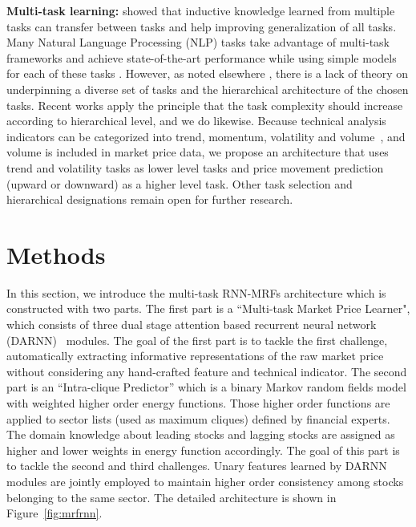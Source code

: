 \textbf{Multi-task learning:} 
showed that inductive knowledge learned from multiple tasks can
transfer between tasks and help improving generalization of all
tasks. Many Natural Language Processing (NLP) tasks take
advantage of multi-task frameworks and achieve state-of-the-art
performance while using simple models for each of these tasks
\cite{sogaard2016deep,hashimoto2016joint}. However, as noted
elsewhere \cite{caruana1993multitask,ruder2017overview}, there is
a lack of theory on underpinning a diverse set of tasks and the
hierarchical architecture of the chosen tasks. Recent works
\cite{sogaard2016deep,hashimoto2016joint} apply the principle
that the task complexity should increase according to
hierarchical level, and we do likewise. Because technical
analysis indicators can be categorized into trend, momentum,
volatility and volume~\cite{kirkpatrick2010technical}, and volume
is included in market price data, we propose an architecture that
uses trend and volatility tasks as lower level tasks and price
movement prediction (upward or downward) as a higher level task.
Other task selection and hierarchical designations remain open
for further research.

\section{Methods}
\label{sec:meth}

In this section, we introduce the multi-task RNN-MRFs
architecture which is constructed with two parts. The first part
is a ``Multi-task Market Price Learner", which consists of three
dual stage attention based recurrent neural network
(DARNN)~\cite{qin2017dual} modules. The goal of the first part is
to tackle the first challenge, \ie automatically extracting
informative representations of the raw market price without
considering any hand-crafted feature and technical indicator. The
second part is an ``Intra-clique Predictor'' which is a binary
Markov random fields model with weighted higher order energy
functions. Those higher order functions are applied to sector
lists (used as maximum cliques) defined by financial experts. The
domain knowledge about leading stocks and lagging stocks are
assigned as higher and lower weights in energy function
accordingly. The goal of this part is to tackle the second and
third challenges. Unary features learned by DARNN modules are
jointly employed to maintain higher order consistency among
stocks belonging to the same sector. The detailed architecture is
shown in Figure~\ref{fig:mrfrnn}.


